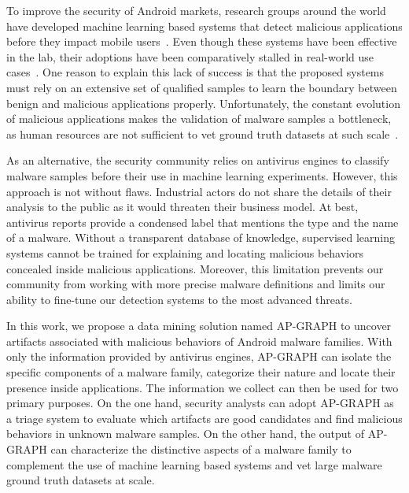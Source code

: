 To improve the security of Android markets, research groups around the world have developed machine learning based systems that detect malicious applications before they impact mobile users~\cite{burguera_crowdroid:_2011,wang_hey_2012,wu_droidmat:_2012,gascon_structural_2013,zia_droidapiminer:_2013,hutchison_andarwin:_2013,arp_drebin:_2014,chen_finding_2015,alam_droidnative:_2016,mariconti_mamadroid:_2017}.
Even though these systems have been effective in the lab, their adoptions have been comparatively stalled in real-world use cases~\cite{allix_empirical_2016, sommer_outside_2010,canto_large_2017,rossow_prudent_2012}.
One reason to explain this lack of success is that the proposed systems must rely on an extensive set of qualified samples to learn the boundary between benign and malicious applications properly.
Unfortunately, the constant evolution of malicious applications makes the validation of malware samples a bottleneck, as human resources are not sufficient to vet ground truth datasets at such scale~\cite{ics2_cybersecurity_2018}.

As an alternative, the security community relies on antivirus engines to classify malware samples before their use in machine learning experiments.
However, this approach is not without flaws.
Industrial actors do not share the details of their analysis to the public as it would threaten their business model.
At best, antivirus reports provide a condensed label that mentions the type and the name of a malware.
Without a transparent database of knowledge, supervised learning systems cannot be trained for explaining and locating malicious behaviors concealed inside malicious applications.
Moreover, this limitation prevents our community from working with more precise malware definitions and limits our ability to fine-tune our detection systems to the most advanced threats.

In this work, we propose a data mining solution named AP-GRAPH to uncover artifacts associated with malicious behaviors of Android malware families.
With only the information provided by antivirus engines, AP-GRAPH can isolate the specific components of a malware family, categorize their nature and locate their presence inside applications.
The information we collect can then be used for two primary purposes.
On the one hand, security analysts can adopt AP-GRAPH as a triage system to evaluate which artifacts are good candidates and find malicious behaviors in unknown malware samples.
On the other hand, the output of AP-GRAPH can characterize the distinctive aspects of a malware family to complement the use of machine learning based systems and vet large malware ground truth datasets at scale.
